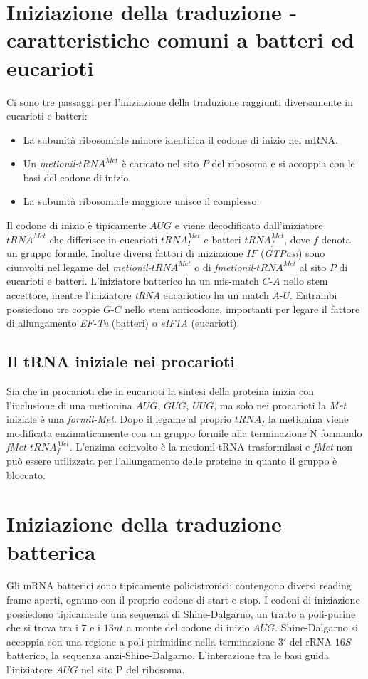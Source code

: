 \section{Iniziazione della traduzione - caratteristiche comuni a batteri ed eucarioti}
Ci sono tre passaggi per l'iniziazione della traduzione raggiunti diversamente in eucarioti e batteri:
\begin{itemize}
	\item La subunit\`a ribosomiale minore identifica il codone di inizio nel mRNA.
	\item Un \emph{metionil-$tRNA^{Met}$} \`e caricato nel sito $P$ del ribosoma e si accoppia con le basi del codone di inizio.
	\item La subunit\`a ribosomiale maggiore unisce il complesso.
\end{itemize}
Il codone di inizio \`e tipicamente $AUG$ e viene decodificato dall'iniziatore $tRNA^{Met}$ che differisce in eucarioti $tRNA_I^{Met}$ e batteri $tRNA_f^{Met}$, dove $f$ denota un gruppo formile. 
Inoltre diversi fattori di iniziazione $IF$ (\emph{GTPasi}) sono ciunvolti nel legame del \emph{metionil-$tRNA^{Met}$} o di \emph{fmetionil-$tRNA^{Met}$} al sito $P$ di eucarioti e batteri. 
L'iniziatore batterico ha un mis-match $C$-$A$ nello stem accettore, mentre l'iniziatore \emph{tRNA} eucariotico ha un match $A$-$U$. Entrambi possiedono tre coppie $G$-$C$ nello stem anticodone, 
importanti per legare il fattore di allungamento \emph{EF-Tu} (batteri) o \emph{eIF1A} (eucarioti).
\subsection{Il tRNA iniziale nei procarioti}
Sia che in procarioti che in eucarioti la sintesi della proteina inizia con l'inclusione di una metionina $AUG$, $GUG$, $UUG$, ma solo nei procarioti la \emph{Met} iniziale \`e una \emph{formil-Met}. 
Dopo il legame al proprio $tRNA_I$ la metionina viene modificata enzimaticamente con un gruppo formile alla terminazione N formando \emph{fMet-$tRNA_f^{Met}$}. L'enzima coinvolto \`e la
metionil-tRNA trasformilasi e \emph{fMet} non pu\`o essere utilizzata per l'allungamento delle proteine in quanto il gruppo \emph{} \`e bloccato. 
\section{Iniziazione della traduzione batterica}
Gli mRNA batterici sono tipicamente policistronici: contengono diversi reading frame aperti, ognuno con il proprio codone di start e stop. I codoni di iniziazione possiedono tipicamente una 
sequenza di Shine-Dalgarno, un tratto a poli-purine che si trova tra i $7$ e i $13nt$ a monte del codone di inizio $AUG$. Shine-Dalgarno si accoppia con una regione a poli-pirimidine nella terminazione
$3'$ del rRNA $16S$ batterico, la sequenza anzi-Shine-Dalgarno. L'interazione tra le basi guida l'iniziatore $AUG$ nel sito P del ribosoma. 
